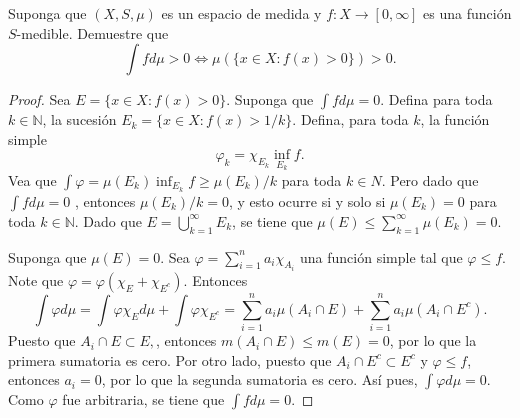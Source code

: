 \documentclass[12pt]{article}
\newcommand{\N}{\mathbb{N}}
\newenvironment{problem}[2][Problema]{\begin{trivlist}
\item[\hskip \labelsep {\bfseries #1}\hskip \labelsep {\bfseries #2.}]}{\end{trivlist}}
\begin{document}

\begin{problem}{15}
    Suponga que $(X, S, \mu)$ es un espacio de medida y $f: X \rightarrow [0, \infty]$ es una función $S$-medible. Demuestre que
    $$\int f d \mu > 0 \iff \mu \left( \{ x \in X: f(x) > 0 \} \right) > 0. $$
\end{problem}
\begin{proof}
    Sea $E = \{ x \in X: f(x) > 0 \}.$ Suponga que $\int f d \mu = 0$. Defina para toda $k \in \N$, la sucesión $E_k = \{ x\in X: f(x) > 1/k\}$. Defina, para toda $k$, la función simple 
    $$\varphi_k = \chi_{E_k} \inf_{E_k} f.$$
    Vea que $\int \varphi = \mu(E_k) \inf_{E_k} f \geq \mu(E_k) / k$ para toda $k\in N.$ Pero dado que $\int f d \mu = 0$ , entonces $ \mu(E_k) / k = 0$, y esto ocurre si y solo si $\mu(E_k) = 0$ para toda $k\in \N.$ Dado que $E = \bigcup_{k=1}^\infty E_k$, se tiene que $\mu(E) \leq \sum_{k=1}^\infty \mu(E_k) = 0.$

    Suponga que $\mu(E) = 0.$ Sea $\varphi = \sum_{i=1}^n a_i \chi_{A_i}$ una función simple tal que $\varphi \leq f.$ Note que $\varphi = \varphi ( \chi_E  + \chi_{E^c} ).$ Entonces 
    $$\int \varphi d \mu = \int \varphi \chi_E d \mu + \int \varphi \chi_{E^c} = \sum_{i=1}^n a_i \mu (A_i \cap E) + \sum_{i=1}^n a_i \mu(A_i \cap E^c).$$
    Puesto que $A_i \cap E \subset E,$, entonces $m(A_i \cap E) \leq m(E) = 0$, por lo que la primera sumatoria es cero. Por otro lado, puesto que $A_i \cap E^c \subset E^c$ y $\varphi \leq f$, entonces $a_i = 0$, por lo que la segunda sumatoria es cero. Así pues, $\int \varphi d \mu = 0$. Como $\varphi$ fue arbitraria, se tiene que $\int f d\mu = 0.$
\end{proof}
\end{document}

